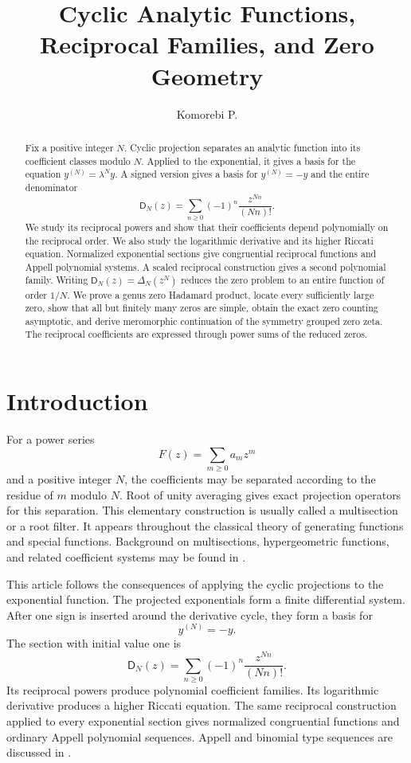 \documentclass{aomart}
\title[Cyclic analytic functions]{Cyclic Analytic Functions, Reciprocal Families, and Zero Geometry}
\author[Komorebi P.]{Komorebi P.}
\theoremstyle{definition}
\theoremstyle{remark}
\newcommand{\Dfun}{\mathsf D}
\begin{document}
\begin{abstract}
Fix a positive integer $N$.  Cyclic projection separates an analytic function into its coefficient classes modulo $N$.  Applied to the exponential, it gives a basis for the equation $y^{(N)}=\lambda^Ny$.  A signed version gives a basis for $y^{(N)}=-y$ and the entire denominator
\[
\Dfun_N(z)=\sum_{n\geq 0}(-1)^n\frac{z^{Nn}}{(Nn)!}.
\]
We study its reciprocal powers and show that their coefficients depend polynomially on the reciprocal order.  We also study the logarithmic derivative and its higher Riccati equation.  Normalized exponential sections give congruential reciprocal functions and Appell polynomial systems.  A scaled reciprocal construction gives a second polynomial family.  Writing $\Dfun_N(z)=\Delta_N(z^N)$ reduces the zero problem to an entire function of order $1/N$.  We prove a genus zero Hadamard product, locate every sufficiently large zero, show that all but finitely many zeros are simple, obtain the exact zero counting asymptotic, and derive meromorphic continuation of the symmetry grouped zero zeta.  The reciprocal coefficients are expressed through power sums of the reduced zeros.
\end{abstract}
\maketitle
\thispagestyle{plain}

\section{Introduction}\label{sec:introduction}

For a power series
\[
F(z)=\sum_{m\geq 0}a_mz^m
\]
and a positive integer $N$, the coefficients may be separated according to the residue of $m$ modulo $N$.  Root of unity averaging gives exact projection operators for this separation.  This elementary construction is usually called a multisection or a root filter.  It appears throughout the classical theory of generating functions and special functions.  Background on multisections, hypergeometric functions, and related coefficient systems may be found in \cite{Rainville1960,AndrewsAskeyRoy1999,Comtet1974}.

This article follows the consequences of applying the cyclic projections to the exponential function.  The projected exponentials form a finite differential system.  After one sign is inserted around the derivative cycle, they form a basis for
\[
y^{(N)}=-y.
\]
The section with initial value one is
\[
\Dfun_N(z)=\sum_{n\geq 0}(-1)^n\frac{z^{Nn}}{(Nn)!}.
\]
Its reciprocal powers produce polynomial coefficient families.  Its logarithmic derivative produces a higher Riccati equation.  The same reciprocal construction applied to every exponential section gives normalized congruential functions and ordinary Appell polynomial sequences.  Appell and binomial type sequences are discussed in \cite{Roman1984,Comtet1974}.
\end{document}
